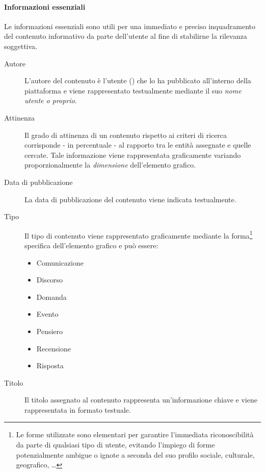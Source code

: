 \documentclass[10pt,a4paper,headinclude,footinclude,hidelinks]{scrreprt} %
\begin{document}
	\paragraph{Informazioni essenziali} Le informazioni essenziali sono utili per una immediato e preciso inquadramento del contenuto informativo da parte dell'utente al fine di stabilirne la rilevanza soggettiva.
	\begin{description}
	\item[Autore] L'autore del contenuto è l'utente (\textit{}) che lo ha pubblicato all'interno della piattaforma e viene rappresentato testualmente mediante il suo \textit{nome utente o proprio}.
	\item[Attinenza] Il grado di attinenza di un contenuto rispetto ai criteri di ricerca corrisponde - in percentuale - al rapporto tra le entità assegnate e quelle cercate. Tale informazione viene rappresentata graficamente variando proporzionalmente la \textit{dimensione} dell'elemento grafico.
	\item[Data di pubblicazione] La data di pubblicazione del contenuto viene indicata testualmente.
	\item[Tipo] Il tipo di contenuto viene rappresentato graficamente mediante la forma\footnote{Le forme utilizzate sono elementari per garantire l'immediata riconoscibilità da parte di qualsiasi tipo di utente, evitando l'impiego di forme potenzialmente ambigue o ignote a seconda del suo profilo sociale, culturale, geografico, \ldots} specifica dell'elemento grafico e può essere:
	\begin{itemize}
	\item Comunicazione
	\item Discorso
	\item Domanda
	\item Evento
	\item Pensiero
	\item Recensione
	\item Risposta
	\end{itemize}	 
	\item[Titolo] Il titolo assegnato al contenuto rappresenta un'informazione chiave e viene rappresentata in formato testuale.
	\end{description}
\end{document}

